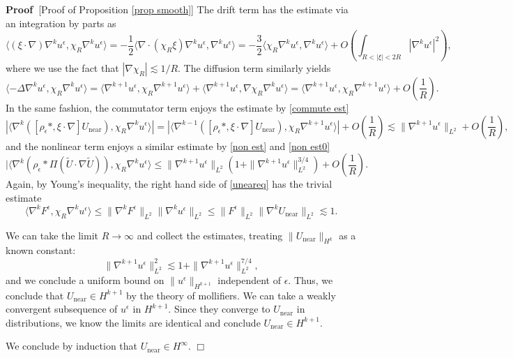 \documentclass[11pt,a4paper]{article}
\numberwithin{equation}{section}
\newcommand{\cdummy}{\cdot}
\newcommand{\tmop}[1]{\ensuremath{\operatorname{#1}}}
\newenvironment{proof}{\noindent\textbf{Proof\ }}{\hspace*{\fill}$\Box$\medskip}
\begin{document}
\begin{proof}[Proof of Proposition \ref{prop smooth}]
       The drift term has the estimate via an integration by parts as\[\langle(\xi \cdummy\nabla)
       \nabla^{k} u^\epsilon,\chi_R\nabla^{k} u^\epsilon\rangle=-\frac12\langle\nabla\cdot(\chi_R\xi )
       \nabla^{k} u^\epsilon,\nabla^{k} u^\epsilon\rangle=-\frac 32\langle\chi_R
       \nabla^{k} u^\epsilon,\nabla^{k} u^\epsilon\rangle+O(\int_{R<|\xi|<2R}|\nabla^{k} u^\epsilon|^2),\]
       where we use the fact that $|\nabla\chi_R|\lesssim1/R$. The diffusion term similarly yields\[\langle- \Delta \nabla^{k}
       u^\epsilon,\chi_R\nabla^{k} u^\epsilon\rangle=\langle
       \nabla^{k+1} u^\epsilon,\chi_R\nabla^{k+1} u^\epsilon\rangle+\langle
       \nabla^{k+1} u^\epsilon,\nabla\chi_R\nabla^{k} u^\epsilon\rangle=\langle
       \nabla^{k+1} u^\epsilon,\chi_R\nabla^{k+1} u^\epsilon\rangle+O(\frac1R).\]
       In the same fashion, the commutator term enjoys the estimate by \eqref{commute est} \[|\langle\nabla^k([\rho_\epsilon *,\xi\cdot\nabla]U_{\tmop{near}}),\chi_R\nabla^{k} u^\epsilon\rangle|=|\langle\nabla^{k-1}([\rho_\epsilon *,\xi\cdot\nabla]U_{\tmop{near}}),\chi_R\nabla^{k+1}u^\epsilon\rangle|+O(\frac1R)\lesssim\|\nabla^{k+1}u^\epsilon\|_{L^2}+O(\frac1R),\]
       and the nonlinear term enjoys a similar estimate by \eqref{non est} and \eqref{non est0} \[|\langle\nabla^k(\rho_\epsilon *\Pi (\widetilde{U} \cdot \nabla \widetilde{U})),\chi_R\nabla^{k} u^\epsilon\rangle\leqslant\|\nabla^{k+1}u^\epsilon\|_{L^2}(1+\|\nabla^{k+1}u^\epsilon\|_{L^2}^{3/4})+O(\frac1R).\]
       Again, by Young's inequality,
       the right hand side of \eqref{uneareq} has the trivial estimate \[\langle\nabla^kF^\epsilon,\chi_R\nabla^{k} u^\epsilon\rangle\leqslant\|\nabla^kF^\epsilon\|_{L^2}\|\nabla^{k} u^\epsilon\|_{L^2}\leqslant\|F^\epsilon\|_{L^2}\|\nabla^{k} U_{\tmop{near}}\|_{L^2}\lesssim1.\]
       
       We can take the limit $R\to\infty$ and collect the estimates, treating $\|U_{\tmop{near}}\|_{H^k}$ as a known constant:\begin{equation*}
           \label{unear col}
           \|\nabla^{k+1}u^\epsilon\|_{L^2}^2\lesssim1+\|\nabla^{k+1}u^\epsilon\|_{L^2}^{7/4},
       \end{equation*}
       and we conclude a uniform bound on $\|u^\epsilon\|_{H^{k+1}}$ independent of $\epsilon$. Thus, we conclude that $U_{\tmop{near}}\in H^{k+1}$ by the theory of mollifiers. We can take a weakly convergent subsequence of $u^\epsilon$ in $H^{k+1}$. Since they converge to $U_{\tmop{near}}$ in distributions, we know the limits are identical and conclude $U_{\tmop{near}}\in H^{k+1}$.

 We conclude by induction
  that $U_{\tmop{near}}\in H^\infty$.
\end{proof}
\end{document}
